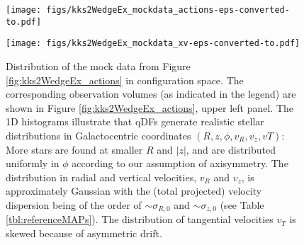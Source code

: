 \documentclass[iop,revtex4,numberedappendix,appendixfloats]{emulateapj}
\begin{document}
\begin{figure}[!htbp]
\centering
\begin{minipage}{0.48\textwidth}
\centering
\texttt{[image: figs/kks2WedgeEx\_mockdata\_actions-eps-converted-to.pdf]}
\caption{Distribution of mock data in action space (2D iso-density contours, enclosing 80\% of the stars), depending on shape and position of a wedge-like survey observation volume (upper left panel, see also Appendix \ref{app:selectionfunction}) and temperature of the stellar population (indicated in the legend). The four mock data sets are generated in the \texttt{KKS-Pot} from Table \ref{tbl:referencepotentials} from either the \texttt{hot} or \texttt{cool} DF in Table \ref{tbl:referenceMAPs}. The distribution in action space visualizes how orbits with different actions reach into different regions within the Galaxy. The corresponding mock data in configuration space is shown in Figure \ref{fig:kks2WedgeEx_xv}.} 
\label{fig:kks2WedgeEx_actions}
\end{minipage}
\hfill
\begin{minipage}{0.48\textwidth}
\centering
\texttt{[image: figs/kks2WedgeEx\_mockdata\_xv-eps-converted-to.pdf]}
\caption{Distribution of the mock data from Figure \ref{fig:kks2WedgeEx_actions} in configuration space. The corresponding observation volumes (as indicated in the legend) are shown in Figure \ref{fig:kks2WedgeEx_actions}, upper left panel. The 1D histograms illustrate that qDFs generate realistic stellar distributions in Galactocentric coordinates $(R,z,\phi,v_R,v_z,vT)$: More stars are found at smaller $R$ and $|z|$, and are distributed uniformly in $\phi$ according to our assumption of axisymmetry. The distribution in radial and vertical velocities, $v_R$ and $v_z$, is approximately Gaussian with the (total projected) velocity dispersion being of the order of $\sim\sigma_{R,0}$ and $\sim\sigma_{z,0}$ (see Table \ref{tbl:referenceMAPs}). The distribution of tangential velocities $v_T$ is skewed because of asymmetric drift.} 
\label{fig:kks2WedgeEx_xv}
\end{minipage}
\end{figure}
\end{document}
